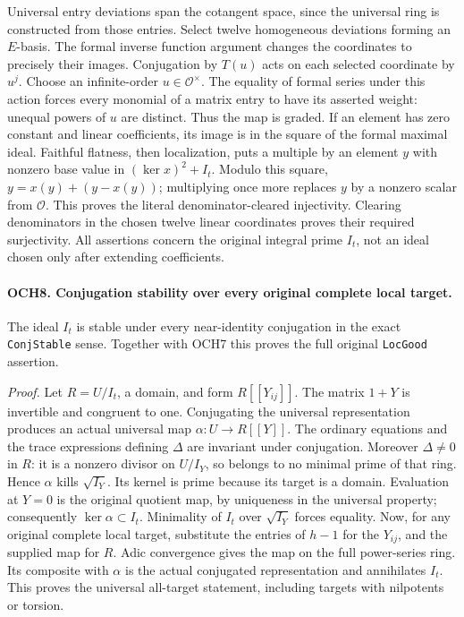 \documentclass[11pt,a4paper]{article}
\numberwithin{equation}{section}
\theoremstyle{remark}\newtheorem{remark}[theorem]{Remark}
\begin{document}
Universal entry deviations span the cotangent space, since the
universal ring is constructed from those entries.  Select twelve
homogeneous deviations forming an \(E\)-basis.  The formal inverse
function argument changes the coordinates to precisely their images.
Conjugation by \(T(u)\) acts on each selected coordinate by
\(u^j\).  Choose an infinite-order \(u\in\mathcal O^\times\).
The equality of formal series under this action forces every monomial
of a matrix entry to have its asserted weight: unequal powers of
\(u\) are distinct.  Thus the map is graded.
If an element has zero constant and linear coefficients, its image
is in the square of the formal maximal ideal.  Faithful flatness,
then localization, puts a multiple by an element \(y\) with
nonzero base value in \((\ker x)^2+I_t\).  Modulo this square,
\(y=x(y)+(y-x(y))\); multiplying once more replaces \(y\)
by a nonzero scalar from \(\mathcal O\).  This proves the
literal denominator-cleared injectivity.  Clearing denominators in
the chosen twelve linear coordinates proves their required
surjectivity.  All assertions concern the original integral prime
\(I_t\), not an ideal chosen only after extending coefficients.

\paragraph{OCH8. Conjugation stability over every original complete local target.}
\label{claim:OCH8}
The ideal \(I_t\) is stable under every near-identity conjugation
in the exact \texttt{Conj\allowbreak Stable} sense.  Together with OCH7 this
proves the full original \texttt{Loc\allowbreak Good} assertion.

\emph{Proof.}
Let \(R=U/I_t\), a domain, and form
\(R[[Y_{ij}]]\).  The matrix \(1+Y\) is invertible and
congruent to one.  Conjugating the universal representation produces
an actual universal map
\(\alpha:U\to R[[Y]]\).  The ordinary equations and the
trace expressions defining \(\Delta\) are invariant under
conjugation.  Moreover \(\Delta\ne0\) in \(R\): it is a
nonzero divisor on \(U/I_Y\), so belongs to no minimal prime
of that ring.  Hence \(\alpha\) kills \(\sqrt{I_Y}\).
Its kernel is prime because its target is a domain.  Evaluation at
\(Y=0\) is the original quotient map, by uniqueness in the
universal property; consequently \(\ker\alpha\subset I_t\).
Minimality of \(I_t\) over \(\sqrt{I_Y}\) forces equality.
Now, for any original complete local target, substitute the entries
of \(h-1\) for the \(Y_{ij}\), and the supplied map for
\(R\).  Adic convergence gives the map on the full power-series
ring.  Its composite with \(\alpha\) is the actual conjugated
representation and annihilates \(I_t\).  This proves the universal
all-target statement, including targets with nilpotents or torsion.
\end{document}
